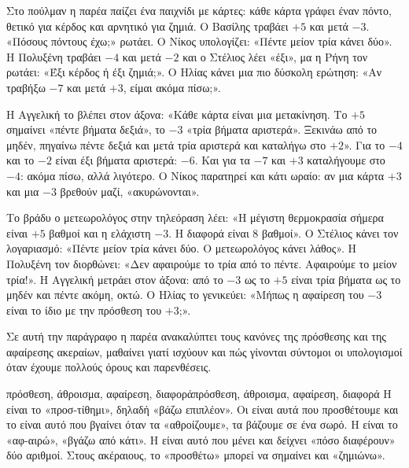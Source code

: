 
\begin{anagke}
Στο πούλμαν η παρέα παίζει ένα παιχνίδι με κάρτες: κάθε κάρτα γράφει έναν πόντο, θετικό για κέρδος και αρνητικό για ζημιά. Ο Βασίλης τραβάει $+5$ και μετά $-3$. «Πόσους πόντους έχω;» ρωτάει. Ο Νίκος υπολογίζει: «Πέντε μείον τρία κάνει δύο». Η Πολυξένη τραβάει $-4$ και μετά $-2$ και ο Στέλιος λέει «έξι», μα η Ρήνη τον ρωτάει: «Έξι κέρδος ή έξι ζημιά;». Ο Ηλίας κάνει μια πιο δύσκολη ερώτηση: «Αν τραβήξω $-7$ και μετά $+3$, είμαι ακόμα πίσω;».

Η Αγγελική το βλέπει στον άξονα: «Κάθε κάρτα είναι μια μετακίνηση. Το $+5$ σημαίνει «πέντε βήματα δεξιά», το $-3$ «τρία βήματα αριστερά». Ξεκινάω από το μηδέν, πηγαίνω πέντε δεξιά και μετά τρία αριστερά και καταλήγω στο $+2$». Για το $-4$ και το $-2$ είναι έξι βήματα αριστερά: $-6$. Και για τα $-7$ και $+3$ καταλήγουμε στο $-4$: ακόμα πίσω, αλλά λιγότερο. Ο Νίκος παρατηρεί και κάτι ωραίο: αν μια κάρτα $+3$ και μια $-3$ βρεθούν μαζί, «ακυρώνονται».

Το βράδυ ο μετεωρολόγος στην τηλεόραση λέει: «Η μέγιστη θερμοκρασία σήμερα είναι $+5$ βαθμοί και η ελάχιστη $-3$. Η διαφορά είναι $8$ βαθμοί». Ο Στέλιος κάνει τον λογαριασμό: «Πέντε μείον τρία κάνει δύο. Ο μετεωρολόγος κάνει λάθος». Η Πολυξένη τον διορθώνει: «Δεν αφαιρούμε το τρία από το πέντε. Αφαιρούμε το μείον τρία!». Η Αγγελική μετράει στον άξονα: από το $-3$ ως το $+5$ είναι τρία βήματα ως το μηδέν και πέντε ακόμη, οκτώ. Ο Ηλίας το γενικεύει: «Μήπως η αφαίρεση του $-3$ είναι το ίδιο με την πρόσθεση του $+3$;».

Σε αυτή την παράγραφο η παρέα ανακαλύπτει τους κανόνες της πρόσθεσης και της αφαίρεσης ακεραίων, μαθαίνει γιατί ισχύουν και πώς γίνονται σύντομοι οι υπολογισμοί όταν έχουμε πολλούς όρους και παρενθέσεις.
\end{anagke}

\begin{lexi}{πρόσθεση, άθροισμα, αφαίρεση, διαφορά}{πρόσθεση, άθροισμα, αφαίρεση, διαφορά}
Η  είναι το «προσ-τίθημι», δηλαδή «βάζω επιπλέον». Οι  είναι αυτά που προσθέτουμε και το  είναι αυτό που βγαίνει όταν τα «αθροίζουμε», τα βάζουμε σε ένα σωρό. Η  είναι το «αφ-αιρώ», «βγάζω από κάτι». Η  είναι αυτό που μένει και δείχνει «πόσο διαφέρουν» δύο αριθμοί. Στους ακέραιους, το «προσθέτω» μπορεί να σημαίνει και «ζημιώνω».
\end{lexi}

